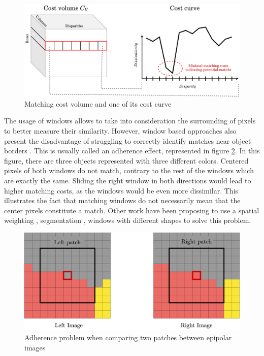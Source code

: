 \begin{figure}
	\centering
	\includegraphics[width=\linewidth]{Images/Chap_1/Cost_volume.png}
	\caption{Matching cost volume and one of its cost curve}
	\label{fig:cost_volume}
\end{figure}

The usage of windows allows to take into consideration the surrounding of pixels to better measure their similarity. However, window based approaches also present the disadvantage of struggling to correctly identify matches near object borders \cite{hirschmuller_real-time_2002}. This is usually called an adherence effect, represented in figure \ref{fig:adherence_window}. In this figure, there are three objects represented with three different colors. Centered pixels of both windows do not match, contrary to the rest of the windows which are exactly the same. Sliding the right window in both directions would lead to higher matching costs, as the windows would be even more dissimilar. This illustrates the fact that matching windows do not necessarily mean that the center pixels constitute a match. Other work have been proposing to use a spatial weighting \cite{kuk-jin_yoon_locally_2005}, segmentation \cite{hutchison_segmentation-based_2007}, windows with different shapes \cite{ke_zhang_cross-based_2009, buades_reliable_2015} to solve this problem. 
\begin{figure}
	\centering
	\includegraphics[width=\linewidth]{Images/Chap_1/Adherence_window.png}
	\caption{Adherence problem when comparing two patches between epipolar images}
	\label{fig:adherence_window}
\end{figure}

